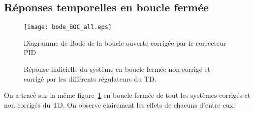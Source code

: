 \subsection*{Réponses temporelles en boucle fermée}

\begin{figure}[!h]
    \centering
    \texttt{[image: bode\_BOC\_all.eps]}
    \caption{Diagramme de Bode de la boucle ouverte corrigée par 
    le correcteur PID}
\end{figure}
\clearpage
\begin{figure}
\centering
{}

\caption{Réponse indicielle du système en boucle fermée non corrigé 
         et corrigé par les différents régulateurs 
         du TD.~\label{fig-reponses_indicielles}}
\end{figure}
On a tracé sur la même figure~\ref{fig-reponses_indicielles} en boucle fermée 
de tout les systèmes corrigés et non corrigés du TD. On observe clairement les
effets de chacuns d'entre eux:
